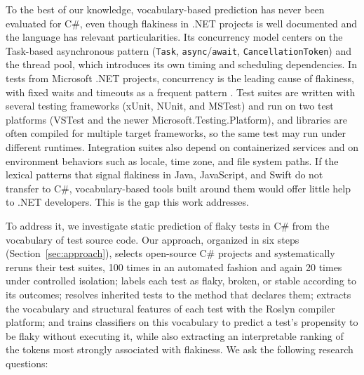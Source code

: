 To the best of our knowledge, vocabulary-based prediction has never been evaluated for C\#, even though flakiness in .NET projects is well documented \cite{lam2019root, lam2020study, leesatapornwongsa2022flakerepro} and the language has relevant particularities. Its concurrency model centers on the Task-based asynchronous pattern (\texttt{Task}, \texttt{async}/\texttt{await}, \texttt{CancellationToken}) and the thread pool, which introduces its own timing and scheduling dependencies. In tests from Microsoft .NET projects, concurrency is the leading cause of flakiness, with fixed waits and timeouts as a frequent pattern \cite{leesatapornwongsa2022flakerepro}. Test suites are written with several testing frameworks (xUnit, NUnit, and MSTest) and run on two test platforms (VSTest and the newer Microsoft.Testing.Platform), and libraries are often compiled for multiple target frameworks, so the same test may run under different runtimes.  Integration suites also depend on containerized services and on environment behaviors such as locale, time zone, and file system paths. If the lexical patterns that signal flakiness in Java, JavaScript, and Swift do not transfer to C\#, vocabulary-based tools built around them would offer little help to .NET developers. This is the gap this work addresses. 

To address it, we investigate static prediction of flaky tests in C\# from the vocabulary of test source code. Our approach, organized in six steps (Section~\ref{sec:approach}), selects open-source C\# projects and systematically reruns their test suites, 100 times in an automated fashion and again 20 times under controlled isolation; labels each test as flaky, broken, or stable according to its outcomes; resolves inherited tests to the method that declares them; extracts the vocabulary and structural features of each test with the Roslyn compiler platform; and trains classifiers on this vocabulary to predict a test's propensity to be flaky without executing it, while also extracting an interpretable ranking of the tokens most strongly associated with flakiness. We ask the following research questions:

